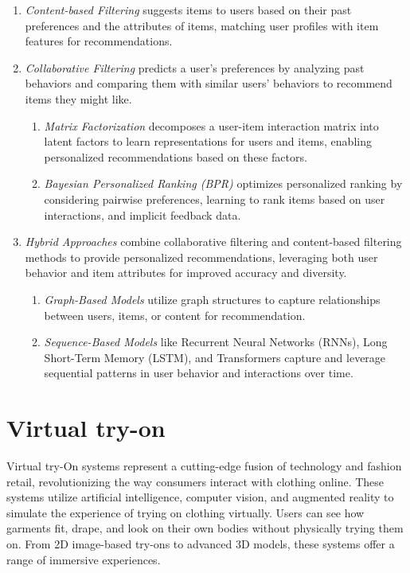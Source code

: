 			\begin{enumerate}
				\item \textit{Content-based Filtering} suggests items to users based on their past preferences and the attributes of items, matching user profiles with item features for recommendations.
				\item \textit{Collaborative Filtering} predicts a user's preferences by analyzing past behaviors and comparing them with similar users' behaviors to recommend items they might like.
					\begin{enumerate}
						\item \textit{Matrix Factorization} decomposes a user-item interaction matrix into latent factors to learn representations for users and items, enabling personalized recommendations based on these factors.
						\item \textit{Bayesian Personalized Ranking (BPR)} optimizes personalized ranking by considering pairwise preferences, learning to rank items based on user interactions, and implicit feedback data.
					\end{enumerate}
				\item \textit{Hybrid Approaches} combine collaborative filtering and content-based filtering methods to provide personalized recommendations, leveraging both user behavior and item attributes for improved accuracy and diversity.
					\begin{enumerate}
						\item \textit{Graph-Based Models} utilize graph structures to capture relationships between users, items, or content for recommendation.
						\item \textit{Sequence-Based Models} like Recurrent Neural Networks (RNNs), Long Short-Term Memory (LSTM), and Transformers capture and leverage sequential patterns in user behavior and interactions over time.
					\end{enumerate}
			\end{enumerate}

\section{Virtual try-on}
	Virtual try-On systems represent a cutting-edge fusion of technology and fashion retail, revolutionizing the way consumers interact with clothing online. These systems utilize artificial intelligence, computer vision, and augmented reality to simulate the experience of trying on clothing virtually. Users can see how garments fit, drape, and look on their own bodies without physically trying them on. From 2D image-based try-ons to advanced 3D models, these systems offer a range of immersive experiences.
	
